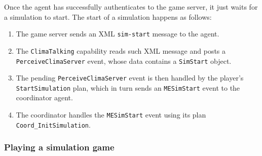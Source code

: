 \documentclass[10pt]{article}
\begin{document}
Once the agent has successfully authenticates to the game server, it just waits
for a simulation to start. The start of a simulation happens as follows:
%
\begin{enumerate}
 \item The game server sends an XML \texttt{sim-start} message to the
agent.

 \item The \texttt{ClimaTalking} capability reads such XML message and posts a
\texttt{PerceiveClimaServer} event, whose data contains a \texttt{SimStart}
object.

\item The pending \texttt{PerceiveClimaServer} event is then handled by
the player's \texttt{StartSimulation} plan, which in turn sends an
\texttt{MESimStart} event to the coordinator agent.

\item The coordinator handles the \texttt{MESimStart} event using its plan
\texttt{Coord\_InitSimulation}.
\end{enumerate}


\subsubsection*{Playing a simulation game}
\end{document}
